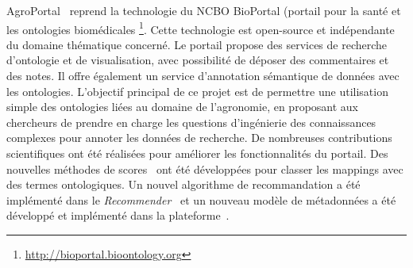 AgroPortal~\cite{Jonquet2016,Jonquet2018} reprend la technologie du NCBO BioPortal (portail pour la santé et les ontologies biomédicales \footnote{\url{http://bioportal.bioontology.org}}. Cette technologie est open-source et indépendante du domaine thématique concerné. Le portail propose des services de recherche d'ontologie et de visualisation, avec possibilité de déposer des commentaires et des notes. Il offre également un service d'annotation sémantique de données avec les ontologies. L'objectif principal de ce projet est de permettre une utilisation simple des ontologies liées au domaine de l'agronomie, en proposant aux chercheurs de prendre en charge les questions d'ingénierie des connaissances complexes pour annoter les données de recherche. De nombreuses contributions scientifiques ont été réalisées pour améliorer les fonctionnalités du portail. Des nouvelles méthodes de scores~\cite{Melzi} ont été développées pour classer les mappings avec des termes ontologiques. Un nouvel algorithme de recommandation a été implémenté dans le \textit{Recommender}~\cite{RomeroJOGPM16} et un nouveau modèle de métadonnées a été développé et implémenté dans la plateforme~\cite{toulet:lirmm-01397388}.\\

